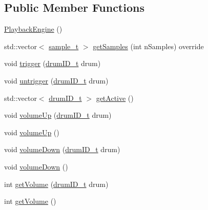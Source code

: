 \subsection*{Public Member Functions}
\begin{DoxyCompactItemize}
\item 
\hyperlink{classdrumpi_1_1audio_1_1PlaybackEngine_a19ac34713d360c934c987cac393152d2}{Playback\+Engine} ()
\item 
std\+::vector$<$ \hyperlink{namespacedrumpi_1_1audio_aca0bdc9164f87b72057e284442abab6e}{sample\+\_\+t} $>$ \hyperlink{classdrumpi_1_1audio_1_1PlaybackEngine_a16f4d8c36323b3b580475cd5fc4421c2}{get\+Samples} (int n\+Samples) override
\item 
void \hyperlink{classdrumpi_1_1audio_1_1PlaybackEngine_a0c089917f4288f1e8338df5ae11c6086}{trigger} (\hyperlink{namespacedrumpi_a3897274035c1b939a604438abe648b1b}{drum\+I\+D\+\_\+t} drum)
\item 
void \hyperlink{classdrumpi_1_1audio_1_1PlaybackEngine_a96c69e995f8c86a2fb5ac132a5bc2a22}{untrigger} (\hyperlink{namespacedrumpi_a3897274035c1b939a604438abe648b1b}{drum\+I\+D\+\_\+t} drum)
\item 
std\+::vector$<$ \hyperlink{namespacedrumpi_a3897274035c1b939a604438abe648b1b}{drum\+I\+D\+\_\+t} $>$ \hyperlink{classdrumpi_1_1audio_1_1PlaybackEngine_ac0400bef789e9d731bd8fef84da6f81e}{get\+Active} ()
\item 
void \hyperlink{classdrumpi_1_1audio_1_1PlaybackEngine_ac2010459b86f361199d812ad9123a948}{volume\+Up} (\hyperlink{namespacedrumpi_a3897274035c1b939a604438abe648b1b}{drum\+I\+D\+\_\+t} drum)
\item 
void \hyperlink{classdrumpi_1_1audio_1_1PlaybackEngine_a60538fdd91cf0891e0c5ba133e51dd98}{volume\+Up} ()
\item 
void \hyperlink{classdrumpi_1_1audio_1_1PlaybackEngine_aaef941772efa599c4782991676670145}{volume\+Down} (\hyperlink{namespacedrumpi_a3897274035c1b939a604438abe648b1b}{drum\+I\+D\+\_\+t} drum)
\item 
void \hyperlink{classdrumpi_1_1audio_1_1PlaybackEngine_ac11e4716ab1873f636ade9f762857427}{volume\+Down} ()
\item 
int \hyperlink{classdrumpi_1_1audio_1_1PlaybackEngine_aac50bd6f33b60955821231a57a9adc18}{get\+Volume} (\hyperlink{namespacedrumpi_a3897274035c1b939a604438abe648b1b}{drum\+I\+D\+\_\+t} drum)
\item 
int \hyperlink{classdrumpi_1_1audio_1_1PlaybackEngine_a3125be4c0e13e4a97c10d318e32a63b8}{get\+Volume} ()
\item 

\end{DoxyCompactItemize}
